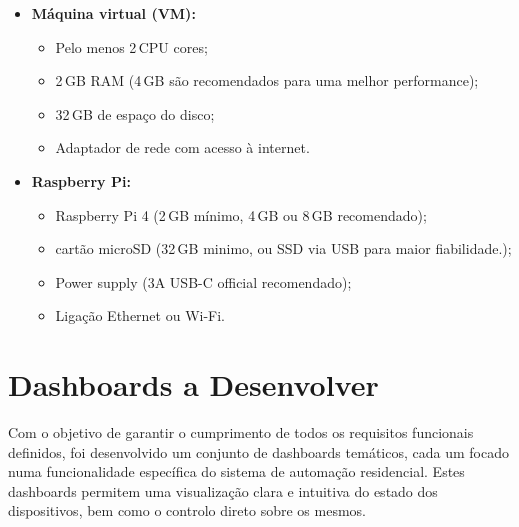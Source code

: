 \begin{itemize}
    \item \textbf{Máquina virtual (VM):}
    \begin{itemize}
        \item Pelo menos 2\,CPU cores;
        \item 2\,GB RAM (4\,GB são recomendados para uma melhor performance);
        \item 32\,GB de espaço do disco;
        \item Adaptador de rede com acesso à internet.
    \end{itemize}
    
    \item \textbf{Raspberry Pi:}
    \begin{itemize}
        \item Raspberry Pi 4 (2\,GB mínimo, 4\,GB ou 8\,GB recomendado);
        \item cartão microSD (32\,GB minimo, ou SSD via USB para maior fiabilidade.);
        \item Power supply (3A USB-C official recomendado);
        \item Ligação Ethernet ou Wi-Fi.
    \end{itemize}
\end{itemize}


\section{Dashboards a Desenvolver}

Com o objetivo de garantir o cumprimento de todos os requisitos funcionais definidos, foi desenvolvido um conjunto de dashboards temáticos, cada um focado numa funcionalidade específica do sistema de automação residencial. Estes dashboards permitem uma visualização clara e intuitiva do estado dos dispositivos, bem como o controlo direto sobre os mesmos.

